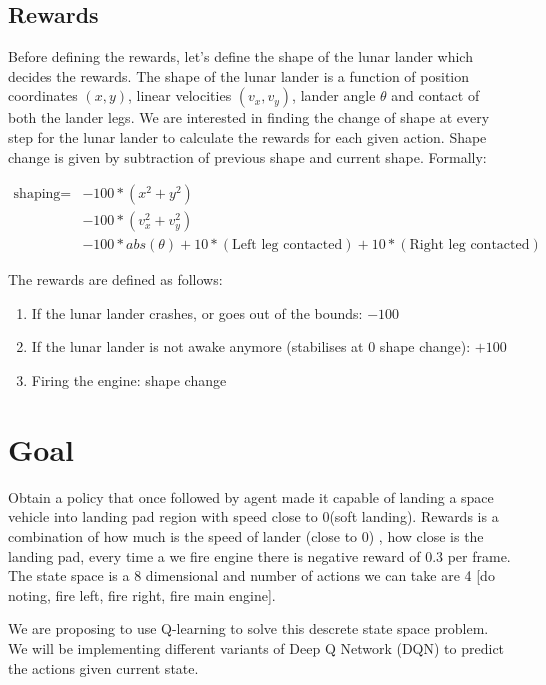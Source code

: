 \subsection{Rewards}

Before defining the rewards, let's define the shape of the lunar lander which decides the rewards. The shape of the lunar lander is a function of position coordinates $(x, y)$, linear velocities $(v_x, v_y)$, lander angle $\theta$ and contact of both the lander legs. We are interested in finding the change of shape at every step for the lunar lander to calculate the rewards for each given action. Shape change is given by subtraction of previous shape and current shape. Formally:

\begin{align*}
\text{shaping} = &- 100*(x^2 + y^2) \\
           & - 100*(v_x^2 + v_y^2) \\
            &- 100*abs(\theta) + 10*(\text{Left leg contacted}) + 10*(\text{Right leg contacted})
\end{align*}

The rewards are defined as follows:

\begin{enumerate}
\item If the lunar lander crashes, or goes out of the bounds: $-100$
\item If the lunar lander is not awake anymore (stabilises at 0 shape change): $+100$
\item Firing the engine: shape change
\end{enumerate}

\section{Goal}

Obtain a policy that once followed by agent made it capable of landing a space vehicle into landing pad region with speed close to 0(soft landing). Rewards is a combination of how much is the speed of lander (close to 0) , how close is the landing pad, every time a we fire engine there is negative reward of 0.3 per frame.  The state space is a 8 dimensional and number of actions we can take are 4 [do noting, fire left, fire right, fire main engine].

We are proposing to use Q-learning to solve this descrete state space problem. We will be implementing different variants of Deep Q Network (DQN) to predict the actions given current state.
